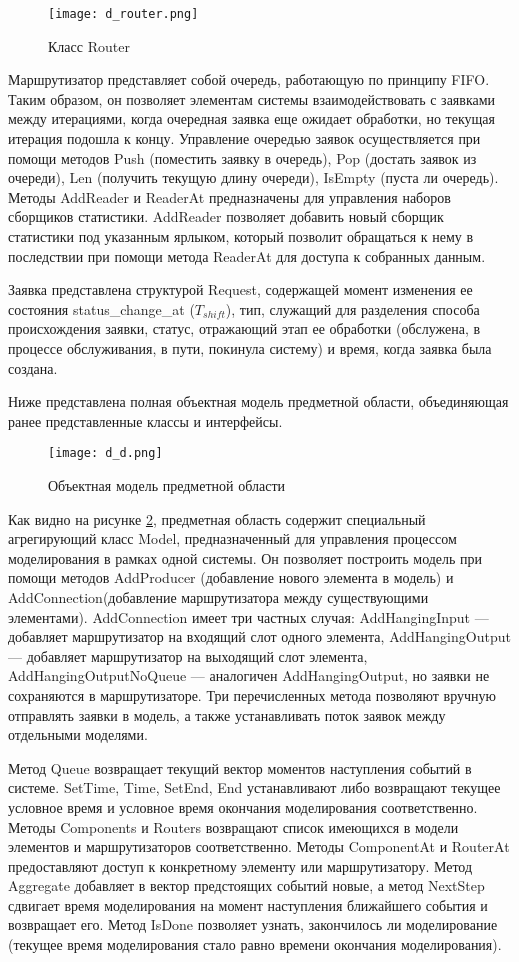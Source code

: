 \begin{figure}[H]
	\centering
	\texttt{[image: d\_router.png]}
	\caption{Класс Router}
	\label{d_router}
\end{figure}
Маршрутизатор представляет собой очередь, работающую по принципу FIFO. Таким образом, он позволяет элементам системы взаимодействовать с заявками между итерациями, когда очередная заявка еще ожидает обработки, но текущая итерация подошла к концу. Управление очередью заявок осуществляется при помощи методов Push (поместить заявку в очередь), Pop (достать заявок из очереди), Len (получить текущую длину очереди), IsEmpty (пуста ли очередь). Методы AddReader и ReaderAt предназначены для управления наборов сборщиков статистики. AddReader позволяет добавить новый сборщик статистики под указанным ярлыком, который позволит обращаться к нему в последствии при помощи метода ReaderAt для доступа к собранных данным.

Заявка представлена структурой Request, содержащей момент изменения ее состояния status\_change\_at ($T_{shift}$), тип, служащий для разделения способа происхождения заявки, статус, отражающий этап ее обработки (обслужена, в процессе обслуживания, в пути, покинула систему) и время, когда заявка была создана.

Ниже представлена полная объектная модель предметной области, объединяющая ранее представленные классы и интерфейсы.
\begin{figure}[H]
	\centering
	\texttt{[image: d\_d.png]}
	\caption{Объектная модель предметной области}
	\label{d_d}
\end{figure}

Как видно на рисунке \ref{d_d}, предметная область содержит специальный агрегирующий класс Model, предназначенный для управления процессом моделирования в рамках одной системы. Он позволяет построить модель при помощи методов AddProducer (добавление нового элемента в модель) и AddConnection(добавление маршрутизатора между существующими элементами). AddConnection имеет три частных случая: AddHangingInput --- добавляет маршрутизатор на входящий слот одного элемента, AddHangingOutput --- добавляет маршрутизатор на выходящий слот элемента, AddHangingOutputNoQueue --- аналогичен AddHangingOutput, но заявки не сохраняются в маршрутизаторе. Три перечисленных метода позволяют вручную отправлять заявки в модель, а также устанавливать поток заявок между отдельными моделями.

Метод Queue возвращает текущий вектор моментов наступления событий в системе. SetTime, Time, SetEnd, End устанавливают либо возвращают текущее условное время и условное время окончания моделирования соответственно. Методы Components и Routers возвращают список имеющихся в модели элементов и маршрутизаторов соответственно. Методы ComponentAt и RouterAt предоставляют доступ к конкретному элементу или маршрутизатору. Метод Aggregate добавляет в вектор предстоящих событий новые, а метод NextStep сдвигает время моделирования на момент наступления ближайшего события и возвращает его. Метод IsDone позволяет узнать, закончилось ли моделирование (текущее время моделирования стало равно времени окончания моделирования).

